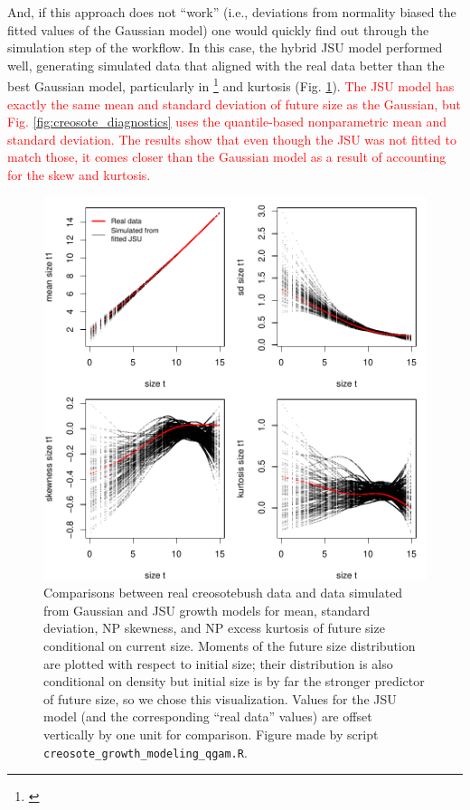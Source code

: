 \documentclass[12pt]{article}
\newcommand{\tom}[2]{{\color{red}{#1}}\footnote{\textit{\color{red}{#2}}}}
\newcommand{\new}{\textcolor{red}}
\begin{document}
And, if this approach does not ``work'' (i.e., deviations from normality biased the fitted values of the Gaussian model) one would quickly find out through the simulation step of the workflow. 
In this case, the hybrid JSU model performed well, generating simulated data that aligned with the real data better than the best Gaussian model, particularly in \tom{standard deviation}{I am a little mystified as to why the JSU is so much better. It is literally the same SD in both distributions. SPE: it's the same SD but not the same quantile-based nonparametric SD, and the JSU gets the nonparametric SD better. With the curves offset, you can see that in also does
better at the NP mean.} and kurtosis (Fig. \ref{fig:creosote_JSU}). \new{The JSU model has exactly the same mean and standard deviation of future size as the Gaussian, but Fig. \ref{fig:creosote_diagnostics} uses the quantile-based 
nonparametric mean and standard deviation. The results show that even though the JSU was not fitted to match those, it comes closer than the Gaussian model as a result of accounting for the skew and kurtosis.} 

\begin{figure}[tbp]
	\centering
	\includegraphics[width=1.0\textwidth]{figures/creosote_JSU_fit.pdf}
	\caption{Comparisons between real creosotebush data and data simulated from Gaussian and JSU growth models for mean, standard deviation, NP skewness, and NP excess kurtosis of future size conditional on current size. 
	Moments of the future size distribution are plotted with respect to initial size; their distribution is also conditional on density but initial size is by far the stronger predictor of future size, so we chose this visualization. 
	Values for the JSU model (and the corresponding ``real data'' values) are offset vertically by one unit for comparison. Figure made by script \texttt{creosote\_growth\_modeling\_qgam.R}.}
	\label{fig:creosote_JSU}
\end{figure} 
\end{document}

